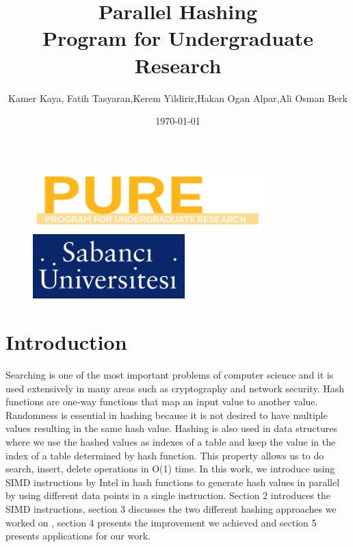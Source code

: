 \documentclass[11pt,oneside,a4paper]{article}
\title{\vspace*{40.0mm}
  \bf\sf Parallel Hashing
         \vspace*{20.0mm} \\
  \vspace*{40.0mm}
  \Large\bf\sf Program for Undergraduate Research \vspace*{20.0mm}}
\author{\sf Kamer Kaya, Fatih Tasyaran,Kerem Yildirir,Hakan Ogan Alpar,Ali Osman Berk}
\date{\sf \today}
\makeatletter
\def\cleardoublepage{\clearpage\if@twoside \ifodd\c@page\else%
\hbox{}%
\thispagestyle{empty}%
\clearpage%
\if@twocolumn\hbox{}\clearpage\fi\fi\fi}
\makeatother
\begin{document}
\begin{figure}
  \parbox[t]{40mm}{
    \begin{flushleft}
      \includegraphics[height=25mm]{pure.png}
    \end{flushleft}}
    \hspace{7cm}
  \parbox[t]{40mm}{
    \begin{flushright}
      \includegraphics[height=25mm]{sabanj.png}
    \end{flushright}}
\end{figure}

\maketitle
\thispagestyle{empty}
\raggedbottom

\cleardoublepage
{}
\setcounter{tocdepth}{2}
\tableofcontents


\section{Introduction}
\par Searching is one of the most important problems of computer science and it is used extensively in many areas such as cryptography and network security. Hash functions are one-way functions that map an input value to another value. Randomness is essential in hashing because it is not desired to have multiple values resulting in the same hash value. Hashing is also used in  data structures where we use the hashed values as indexes of a table  and keep the value in the index of a table determined by hash function. This property allows us to do search, insert, delete operations in O(1) time. In this work, we introduce using SIMD instructions by Intel in hash functions to generate hash values in parallel by using different data points in a single instruction. Section 2 introduces the  SIMD instructions,  section 3 discusses the two different hashing approaches we worked on , section 4 presents the improvement we achieved and section 5 presents applications for our work.
\end{document}
